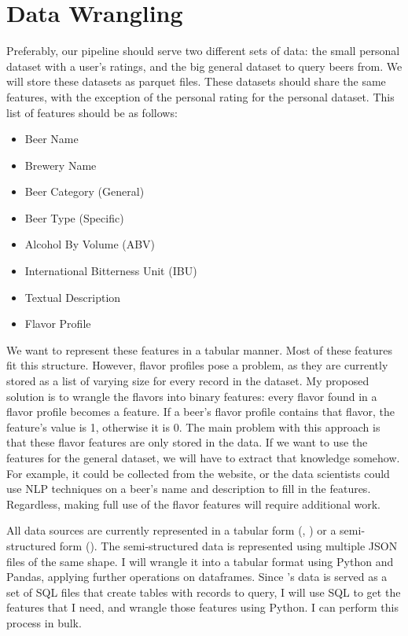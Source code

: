 \documentclass[sigconf, natbib=true]{acmart}
\begin{document}
\section{Data Wrangling}
Preferably, our pipeline should serve two different sets of data: the small personal dataset with a user's ratings, and the big general dataset to query beers from.
We will store these datasets as parquet files.
These datasets should share the same features, with the exception of the personal rating for the personal dataset.
This list of features should be as follows:
\begin{itemize}
    \item Beer Name
    \item Brewery Name
    \item Beer Category (General)
    \item Beer Type (Specific)
    \item Alcohol By Volume (ABV)
    \item International Bitterness Unit (IBU)
    \item Textual Description
    \item Flavor Profile
\end{itemize}
We want to represent these features in a tabular manner.
Most of these features fit this structure.
However, flavor profiles pose a problem, as they are currently stored as a list of varying size for every record in the \citeauthor{untappd} dataset.
My proposed solution is to wrangle the flavors into binary features: every flavor found in a flavor profile becomes a feature.
If a beer's flavor profile contains that flavor, the feature's value is 1, otherwise it is 0.
The main problem with this approach is that these flavor features are only stored in the \citeauthor{untappd} data.
If we want to use the features for the general dataset, we will have to extract that knowledge somehow.
For example, it could be collected from the \citeauthor{untappd} website, or the data scientists could use NLP techniques on a beer's name and description to fill in the features.
Regardless, making full use of the flavor features will require additional work.

All data sources are currently represented in a tabular form (\citeauthor{untappd}, \citeauthor{openbeerdb}) or a semi-structured form (\citeauthor{philipperemy}).
The semi-structured data is represented using multiple JSON files of the same shape.
I will wrangle it into a tabular format using Python and Pandas, applying further operations on dataframes.
Since \citeauthor{openbeerdb}'s data is served as a set of SQL files that create tables with records to query, I will use SQL to get the features that I need, and wrangle those features using Python.
I can perform this process in bulk.
\end{document}

